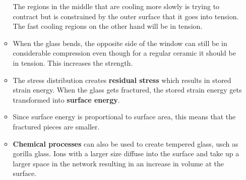 \begin{itemize}
\begin{itemize}
\begin{idea}
            The regions in the middle that are cooling more slowly is trying to contract but is constrained by the outer surface that it goes into tension. The fast cooling regions on the other hand will be in tension.
        \end{idea}
        \item When the glass bends, the opposite side of the window can still be in considerable compression even though for a regular ceramic it should be in tension. This increases the strength.
        \begin{figure}[ht]
            \centering
        \end{figure}
        \item The stress distribution creates \textbf{residual stress} which results in stored strain energy. When the glass gets fractured, the stored strain energy gets transformed into \textbf{surface energy}.
        \item Since surface energy is proportional to surface area, this means that the fractured pieces are smaller.
        \item \textbf{Chemical processes} can also be used to create tempered glass, usch as gorilla glass. Ions with a larger size diffuse into the surface and take up a larger space in the network resulting in an increase in volume at the surface.
    \end{itemize}
\end{itemize}